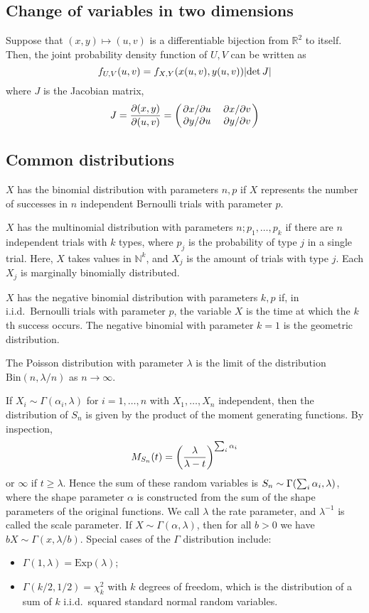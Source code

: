 \subsection{Change of variables in two dimensions}
Suppose that \( (x, y) \mapsto (u,v) \) is a differentiable bijection from \( \mathbb R^2 \) to itself.
Then, the joint probability density function of \( U,V \) can be written as
\[ f_{U,V}(u,v) = f_{X,Y}(x(u,v), y(u,v)) \abs{\det J} \]
where \( J \) is the Jacobian matrix,
\[ J = \pdv{(x,y)}{(u,v)} = \begin{pmatrix}
	\pdv*{x}{u} & \pdv*{x}{v} \\
	\pdv*{y}{u} & \pdv*{y}{v}
\end{pmatrix} \]

\subsection{Common distributions}
\( X \) has the binomial distribution with parameters \( n, p \) if \( X \) represents the number of successes in \( n \) independent Bernoulli trials with parameter \( p \).

\( X \) has the multinomial distribution with parameters \( n; p_1, \dots, p_k \) if there are \( n \) independent trials with \( k \) types, where \( p_j \) is the probability of type \( j \) in a single trial.
Here, \( X \) takes values in \( \mathbb N^k \), and \( X_j \) is the amount of trials with type \( j \).
Each \( X_j \) is marginally binomially distributed.

\( X \) has the negative binomial distribution with parameters \( k, p \) if, in i.i.d.\ Bernoulli trials with parameter \( p \), the variable \( X \) is the time at which the \( k \)th success occurs.
The negative binomial with parameter \( k = 1 \) is the geometric distribution.

The Poisson distribution with parameter \( \lambda \) is the limit of the distribution \( \mathrm{Bin}(n, \lambda/n) \) as \( n \to \infty \).

If \( X_i \sim \Gamma(\alpha_i, \lambda) \) for \( i = 1, \dots, n \) with \( X_1, \dots, X_n \) independent, then the distribution of \( S_n \) is given by the product of the moment generating functions.
By inspection,
\[ M_{S_n}(t) = \qty(\frac{\lambda}{\lambda - t})^{\sum_i \alpha_i} \]
or \( \infty \) if \( t \geq \lambda \).
Hence the sum of these random variables is \( S_n \sim \Gamma\qty(\sum_{i} \alpha_i, \lambda) \), where the shape parameter \( \alpha \) is constructed from the sum of the shape parameters of the original functions.
We call \( \lambda \) the rate parameter, and \( \lambda^{-1} \) is called the scale parameter.
If \( X \sim \Gamma(\alpha, \lambda) \), then for all \( b > 0 \) we have \( bX \sim \Gamma(x, \lambda/b) \).
Special cases of the \( \Gamma \) distribution include:
\begin{itemize}
	\item \( \Gamma(1, \lambda) = \mathrm{Exp}(\lambda) \);
	\item \( \Gamma(k/2, 1/2) = \chi_k^2 \) with \( k \) degrees of freedom, which is the distribution of a sum of \( k \) i.i.d.\ squared standard normal random variables.
\end{itemize}
